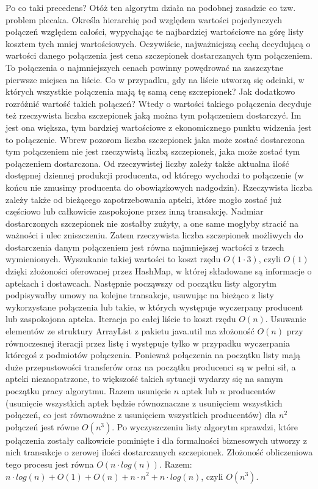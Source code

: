 \documentclass[a4paper]{article}
\newcommand\tab[1][1cm]{\hspace*{#1}}
\begin{document}
\newline \tab Po co taki precedens? Otóż ten algorytm działa na podobnej zasadzie co tzw. problem plecaka. Określa hierarchię pod względem wartości pojedynczych połączeń względem całości, wypychając te najbardziej wartościowe na górę listy kosztem tych mniej wartościowych. Oczywiście, najważniejszą cechą decydującą o wartości danego połączenia jest cena szczepionek dostarczanych tym połączeniem. To połączenia o najmniejszych cenach powinny powędrować na zaszczytne pierwsze miejsca na liście. Co w przypadku, gdy na liście utworzą się odcinki, w których wszystkie połączenia mają tę samą cenę szczepionek? Jak dodatkowo rozróżnić wartość takich połączeń? Wtedy o wartości takiego połączenia decyduje też rzeczywista liczba szczepionek jaką można tym połączeniem dostarczyć. Im jest ona większa, tym bardziej wartościowe z ekonomicznego punktu widzenia jest to połączenie. 
\newline \tab Wbrew pozorom liczba szczepionek jaka może zostać dostarczona tym połączeniem nie jest rzeczywistą liczbą szczepionek, jaka może zostać tym połączeniem dostarczona. Od rzeczywistej liczby zależy także aktualna ilość dostępnej dziennej produkcji producenta, od którego wychodzi to połączenie (w końcu nie zmusimy producenta do obowiązkowych nadgodzin). Rzeczywista liczba zależy także od bieżącego zapotrzebowania apteki, które mogło zostać już częściowo lub całkowicie zaspokojone przez inną transakcję. Nadmiar dostarczonych szczepionek nie zostałby zużyty, a one same mogłyby stracić na ważności i ulec zniszczeniu. Zatem rzeczywista liczba szczepionek możliwych do dostarczenia danym połączeniem jest równa najmniejszej wartości z trzech wymienionych. Wyszukanie takiej wartości to koszt rzędu $O(1\cdot3)$, czyli $O(1)$ dzięki złożoności oferowanej przez HashMap, w której składowane są informacje o aptekach i dostawcach.
\newline \tab Następnie począwszy od początku listy algorytm podpisywałby umowy na kolejne transakcje, usuwując na bieżąco z listy wykorzystane połączenia lub takie, w których występuje wyczerpany producent lub zaspokojona apteka. Iteracja po całej liście to koszt rzędu $O(n)$. Usuwanie elementów ze struktury ArrayList z pakietu java.util ma złożoność $O(n)$ przy równoczesnej iteracji przez listę i występuje tylko w przypadku wyczerpania któregoś z podmiotów połączenia. Ponieważ połączenia na początku listy mają duże przepustowości transferów oraz na początku producenci są w pełni sił, a apteki niezaopatrzone, to większość takich sytuacji wydarzy się na samym początku pracy algorytmu. Razem usunięcie $n$ aptek lub $n$ producentów (usunięcie wszystkich aptek będzie równoznaczne z usunięciem wszystkich połączeń, co jest równoważne z usunięciem wszystkich producentów) dla $n^2$ połączeń jest równe $O(n^3)$.
\newline \tab Po wyczyszczeniu listy algorytm sprawdzi, które połączenia zostały całkowicie pominięte i dla formalności biznesowych utworzy z nich transakcje o zerowej ilości dostarczanych szczepionek. Złożoność obliczeniowa tego procesu jest równa $O(n\cdot log(n))$. 
\newline Razem: $n \cdot log(n) + O(1) + O(n) + n \cdot n^2 + n \cdot log(n)$, czyli $O(n^3)$. 
\end{document}

